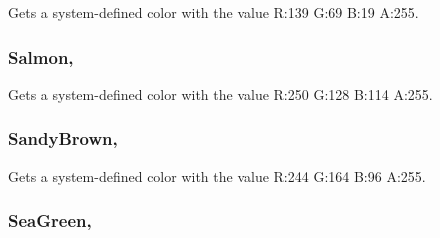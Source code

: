 Gets a system-\/defined color with the value R\+:139 G\+:69 B\+:19 A\+:255.

\hypertarget{structMicrosoft_1_1Xna_1_1Framework_1_1Color_a28950cae146758579e14171090d36462}{}
\subsubsection[{Salmon}]{ Salmon\hspace{0.3cm}{\ttfamily [static]}, {\ttfamily [get]}}\label{structMicrosoft_1_1Xna_1_1Framework_1_1Color_a28950cae146758579e14171090d36462}


Gets a system-\/defined color with the value R\+:250 G\+:128 B\+:114 A\+:255.

\hypertarget{structMicrosoft_1_1Xna_1_1Framework_1_1Color_a1c7bec384c796341d16d863d301d7679}{}
\subsubsection[{Sandy\+Brown}]{ Sandy\+Brown\hspace{0.3cm}{\ttfamily [static]}, {\ttfamily [get]}}\label{structMicrosoft_1_1Xna_1_1Framework_1_1Color_a1c7bec384c796341d16d863d301d7679}


Gets a system-\/defined color with the value R\+:244 G\+:164 B\+:96 A\+:255.

\hypertarget{structMicrosoft_1_1Xna_1_1Framework_1_1Color_a627c960778761dfe508642cb453b2bce}{}
\subsubsection[{Sea\+Green}]{ Sea\+Green\hspace{0.3cm}{\ttfamily [static]}, {\ttfamily [get]}}\label{structMicrosoft_1_1Xna_1_1Framework_1_1Color_a627c960778761dfe508642cb453b2bce}


